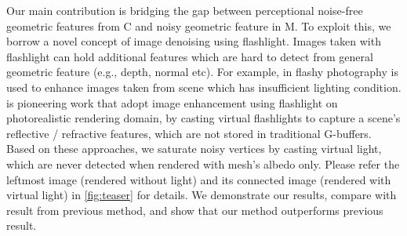 Our main contribution is bridging the gap 
between perceptional noise-free geometric features from C 
and noisy geometric feature in M. 
To exploit this, we borrow a novel concept of 
image denoising using flashlight. Images taken with flashlight can hold additional features 
which are hard to detect from general geometric feature (e.g., depth, normal etc). 
For example, in \cite{eisemann2004flash} \cite{petschnigg2004digital} flashy photography is used to enhance images taken from scene which has insufficient lighting condition. 
\cite{moon2013robust} is pioneering work that adopt image enhancement using flashlight 
on photorealistic rendering domain, by casting virtual flashlights 
to capture a scene’s reflective / refractive features, 
which are not stored in traditional G-buffers. 
Based on these approaches, we saturate noisy vertices 
by casting virtual light, which are never detected 
when rendered with mesh’s albedo only. 
Please refer the leftmost image (rendered without light) 
and its connected image (rendered with virtual light) in \ref{fig:teaser} for details. 
We demonstrate our results, compare with result from previous method, 
and show that our method outperforms previous result.
